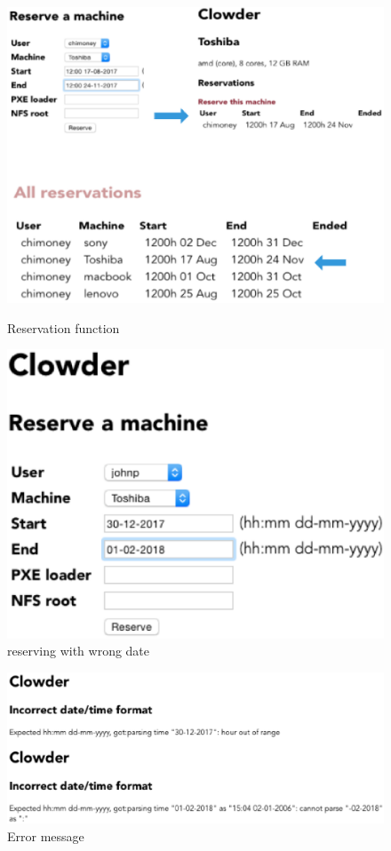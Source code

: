 \begin{figure}[h]
  \includegraphics[width=\linewidth]{reserve.eps}
  \label{reserve}
  \caption{Reservation function}
  \end{figure}
  
\begin{figure}
\includegraphics[width=\linewidth]{dateformat1.eps}
\caption{reserving with wrong date}
\end{figure}

\begin{figure}
\includegraphics[width=\linewidth]{dateformat2.eps}
\caption{Error message}
\label{error}
\end{figure}
\pagebreak

